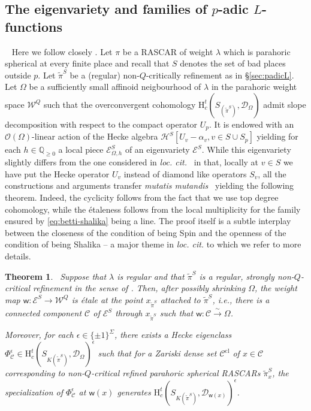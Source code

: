 \documentclass{amsart}
\newtheorem{theorem}[thm]{Theorem}
\theoremstyle{definition}
\newcommand{\Q}{\mathbb{Q}}
\newcommand{\cH}{\mathcal{H}}
\begin{document}
{\subsection{The eigenvariety and families of $p$-adic $L$-functions} 
Here we follow closely \cite[\S8.3]{BDW}. 
Let $\pi$ be a RASCAR of weight $\lambda$  which is parahoric spherical at every finite place and recall that $S$ denotes the set of bad places outside $p$. 
Let $\widetilde\pi^S$ be a (regular) non-$Q$-critically refinement as in \S\ref{sec:padicL}.  
Let $\Omega$ be a sufficiently small affinoid neigbourhood of $\lambda$ in the parahoric weight space $\mathcal{W}^Q$ such that 
the overconvergent cohomology $\mathrm{H}_c^t(S_{(\widetilde\pi^S)},\mathcal{D}_\Omega)$ admit slope decomposition with respect to the compact operator 
$U_p$. It is endowed with an $\mathcal{O}(\Omega)$-linear  action of the Hecke algebra $\cH^S[U_v - \alpha_v, v\in S\cup S_p]$ yielding for each $h\in \Q_{\geqslant 0}$ a local piece $\mathcal{E}^S_{\Omega,h}$ of an eigenvariety $\mathcal{E}^S$. While this eigenvariety slightly differs from the one considered in 
{\it loc. cit. } in that, locally at $v\in S$ we have put the Hecke operator $U_v$  instead of diamond like operators $S_v$, all the constructions and arguments transfer {\it mutatis mutandis } yielding the following theorem. Indeed, the cyclicity  follows from the fact that we use top degree cohomology, while the \'etaleness follows from the local multiplicity for the family  ensured by \eqref{eq:betti-shalika} being a line. The proof itself is a subtle interplay between the closeness of the condition of being Spin and the openness of the condition of being Shalika --  a major theme in  {\it loc. cit. } to which we refer to more details. 

\begin{theorem} \label{t:eigenvariety}
Suppose that $\lambda$ is regular and that $\tilde\pi^S$ is a regular,  strongly non-$Q$-critical refinement in the sense of \cite[Def.~3.14]{BDW}. 
	 Then, after possibly shrinking $\Omega$, 
	the weight map $\mathsf{w}:\mathcal{E}^S\to \mathcal{W}^Q$ is \'etale at the point 	$x_{\tilde\pi^S}$ attached to $\tilde\pi^S$, i.e.,  
there is a 	 connected component $\mathcal{C}$  of $\mathcal{E}^S$ through $x_{\tilde\pi^S}$ such  that $\mathsf{w}:\mathcal{C}\xrightarrow{\sim} \Omega$. 
	
Moreover, for each $\epsilon \in \{\pm1\}^\Sigma$, there exists a Hecke eigenclass $\Phi_{\mathcal{C}}^\epsilon \in 
\mathrm{H}_c^t(S_{K(\widetilde\pi^S)},\mathcal{D}_\Omega)^{\epsilon}$ such that for a  Zariski dense set $\mathcal{C}^{\mathrm{cl}}$  of $x\in \mathcal{C}$  corresponding to non-$Q$-critical refined parahoric spherical RASCARs $\tilde\pi_x^S$,  the specialization of $\Phi_{\mathcal{C}}^\epsilon$ at $\mathsf{w}(x)$ generates 
 $\mathrm{H}_c^t(S_{K(\widetilde\pi^S)},\mathcal{D}_{\mathsf{w}(x)})^{\epsilon}$. 
 \end{theorem} 
 
}
\end{document}
